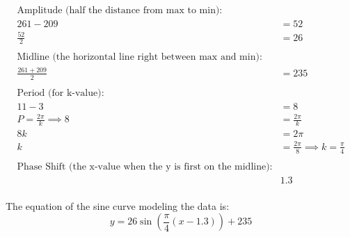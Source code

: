 \documentclass{article}
\begin{document}
\begin{minipage}{0.45\textwidth}
\begin{align*}
\text{Amplitude (half the distance from max to min):} & \\
261 - 209 &= 52 \\
\frac{52}{2} &= 26 \\
\\
\text{Midline (the horizontal line right between max and min):} & \\
\frac{261 + 209}{2} &= 235 \\
\\
\text{Period (for k-value):} & \\
11 - 3 &= 8 \\
P = \frac{2\pi}{k} \implies 8 &= \frac{2\pi}{k} \\
8k &= 2\pi \\
k &= \frac{2\pi}{8} \implies k = \frac{\pi}{4} \\
\\
\text{Phase Shift (the x-value when the y is first on the midline):} & \\
& 1.3 \\
\end{align*}
\end{minipage}

\noindent The equation of the sine curve modeling the data is:
\[
y = 26\sin\left(\frac{\pi}{4}(x - 1.3)\right) + 235
\]
\end{document}
